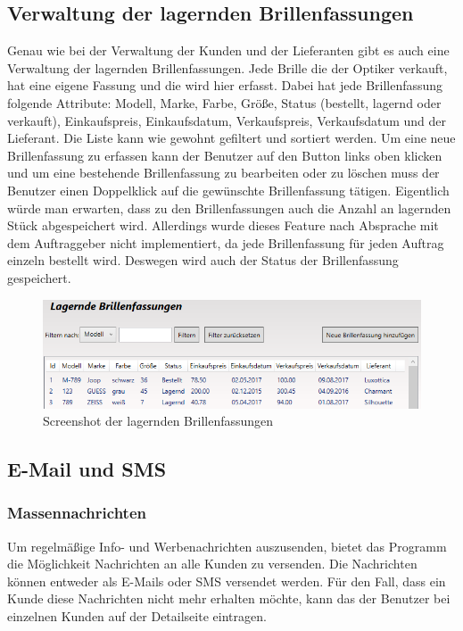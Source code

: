 \subsection{Verwaltung der lagernden Brillenfassungen}
Genau wie bei der Verwaltung der Kunden und der Lieferanten gibt es auch eine Verwaltung der lagernden Brillenfassungen. Jede Brille die der Optiker verkauft, hat eine eigene Fassung und die wird hier erfasst. Dabei hat jede Brillenfassung folgende Attribute: Modell, Marke, Farbe, Größe, Status (bestellt, lagernd oder verkauft), Einkaufspreis, Einkaufsdatum, Verkaufspreis, Verkaufsdatum und der Lieferant. Die Liste kann wie gewohnt gefiltert und sortiert werden. Um eine neue Brillenfassung zu erfassen kann der Benutzer auf den Button links oben klicken und um eine bestehende Brillenfassung zu bearbeiten oder zu löschen muss der Benutzer einen Doppelklick auf die gewünschte Brillenfassung tätigen.
\newline Eigentlich würde man erwarten, dass zu den Brillenfassungen auch die Anzahl an lagernden Stück abgespeichert wird. Allerdings wurde dieses Feature nach Absprache mit dem Auftraggeber nicht implementiert, da jede Brillenfassung für jeden Auftrag einzeln bestellt wird. Deswegen wird auch der Status der Brillenfassung gespeichert. \bigskip
\begin{figure}[H]
\begin{center}
	\includegraphics[scale=.45]{images/Brillenfassungen.png}
\end{center}
	\caption{Screenshot der lagernden Brillenfassungen}
	\label{fig:sample}
\end{figure}
\bigskip
\subsection{E-Mail und SMS} \medskip
\subsubsection{Massennachrichten}
Um regelmäßige Info- und Werbenachrichten auszusenden, bietet das Programm die Möglichkeit Nachrichten an alle Kunden zu versenden. Die Nachrichten können entweder als E-Mails oder SMS versendet werden. Für den Fall, dass ein Kunde diese Nachrichten nicht mehr erhalten möchte, kann das der Benutzer bei einzelnen Kunden auf der Detailseite eintragen.
